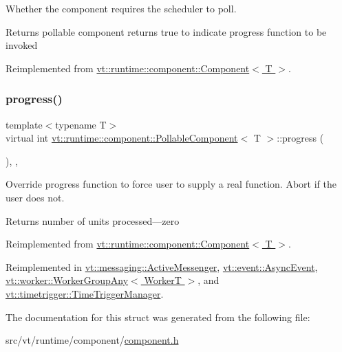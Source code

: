 Whether the component requires the scheduler to poll. 

\begin{DoxyReturn}{Returns}
pollable component returns true to indicate progress function to be invoked 
\end{DoxyReturn}


Reimplemented from \hyperlink{structvt_1_1runtime_1_1component_1_1_component_a5a15bd0369a9d3765a6c70249bada96f}{vt\+::runtime\+::component\+::\+Component$<$ T $>$}.

\mbox{\label{structvt_1_1runtime_1_1component_1_1_pollable_component_a34cad810026224d550cd9b0c9d1eff22}} 
\subsubsection{\texorpdfstring{progress()}{progress()}}
{\footnotesize\ttfamily template$<$typename T$>$ \\
virtual int \hyperlink{structvt_1_1runtime_1_1component_1_1_pollable_component}{vt\+::runtime\+::component\+::\+Pollable\+Component}$<$ T $>$\+::progress (\begin{DoxyParamCaption}{ }\end{DoxyParamCaption})\hspace{0.3cm}{\ttfamily [inline]}, {\ttfamily [override]}, {\ttfamily [virtual]}}



Override progress function to force user to supply a real function. Abort if the user does not. 

\begin{DoxyReturn}{Returns}
number of units processed---zero 
\end{DoxyReturn}


Reimplemented from \hyperlink{structvt_1_1runtime_1_1component_1_1_component_a1dab11d9eb5bed8dfd5a3bb8fdf67f5a}{vt\+::runtime\+::component\+::\+Component$<$ T $>$}.



Reimplemented in \hyperlink{structvt_1_1messaging_1_1_active_messenger_a4cd83c125e144ecbd9425fa7cd194538}{vt\+::messaging\+::\+Active\+Messenger}, \hyperlink{structvt_1_1event_1_1_async_event_a36f18429bc2856a30c8f7fd70654e0a4}{vt\+::event\+::\+Async\+Event}, \hyperlink{structvt_1_1worker_1_1_worker_group_any_a1a2d6dc321514501e00c0373f2583146}{vt\+::worker\+::\+Worker\+Group\+Any$<$ Worker\+T $>$}, and \hyperlink{structvt_1_1timetrigger_1_1_time_trigger_manager_aa2d7955644dc9a1be6e813819b69f711}{vt\+::timetrigger\+::\+Time\+Trigger\+Manager}.



The documentation for this struct was generated from the following file\+:\begin{DoxyCompactItemize}
\item 
src/vt/runtime/component/\hyperlink{component_8h}{component.\+h}\end{DoxyCompactItemize}
